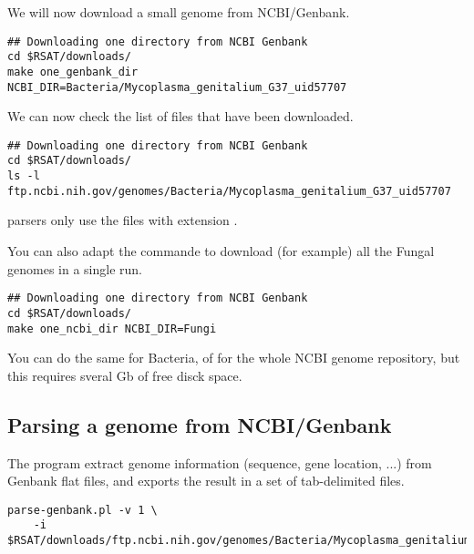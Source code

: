 We will now download a small genome from NCBI/Genbank. 

\begin{footnotesize}
\begin{verbatim}
## Downloading one directory from NCBI Genbank
cd $RSAT/downloads/
make one_genbank_dir NCBI_DIR=Bacteria/Mycoplasma_genitalium_G37_uid57707
\end{verbatim}
\end{footnotesize}

We can now check the list of files that have been downloaded.

\begin{footnotesize}
\begin{verbatim}
## Downloading one directory from NCBI Genbank
cd $RSAT/downloads/
ls -l ftp.ncbi.nih.gov/genomes/Bacteria/Mycoplasma_genitalium_G37_uid57707
\end{verbatim}
\end{footnotesize}

\RSAT parsers only use the files with extension .

You can also adapt the commande to download (for example) all the
Fungal genomes in a single run.

\begin{footnotesize}
\begin{verbatim}
## Downloading one directory from NCBI Genbank
cd $RSAT/downloads/
make one_ncbi_dir NCBI_DIR=Fungi
\end{verbatim}
\end{footnotesize}

You can do the same for Bacteria, of for the whole NCBI genome
repository, but this requires sveral Gb of free disck space.

\subsection{Parsing a genome from NCBI/Genbank}

The program  extract genome information
(sequence, gene location, ...) from Genbank flat files, and exports
the result in a set of tab-delimited files.

\begin{footnotesize}
\begin{verbatim}
parse-genbank.pl -v 1 \
    -i $RSAT/downloads/ftp.ncbi.nih.gov/genomes/Bacteria/Mycoplasma_genitalium 
\end{verbatim}
\end{footnotesize}

